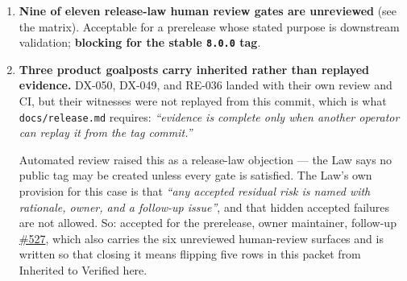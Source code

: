 \begin{enumerate}
\def\labelenumi{\arabic{enumi}.}
\item
  \textbf{Nine of eleven release-law human review gates are unreviewed} (see the matrix). Acceptable for a prerelease whose stated purpose is downstream validation; \textbf{blocking for the stable \texttt{8\allowbreak{}.\allowbreak{}0\allowbreak{}.\allowbreak{}0} tag}.
\item
  \textbf{Three product goalposts carry inherited rather than replayed evidence.} DX-050, DX-049, and RE-036 landed with their own review and CI, but their witnesses were not replayed from this commit, which is what \texttt{d\allowbreak{}o\allowbreak{}c\allowbreak{}s\allowbreak{}/\allowbreak{}r\allowbreak{}e\allowbreak{}l\allowbreak{}e\allowbreak{}a\allowbreak{}s\allowbreak{}e\allowbreak{}.\allowbreak{}m\allowbreak{}d} requires: \emph{``evidence is complete only when another operator can replay it from the tag commit.''}

  Automated review raised this as a release-law objection --- the Law says no public tag may be created unless every gate is satisfied. The Law's own provision for this case is that \emph{``any accepted residual risk is named with rationale, owner, and a follow-up issue''}, and that hidden accepted failures are not allowed. So: accepted for the prerelease, owner maintainer, follow-up \href{https://github.com/flyingrobots/bijou/issues/527}{\#527}, which also carries the six unreviewed human-review surfaces and is written so that closing it means flipping five rows in this packet from Inherited to Verified here.


\end{enumerate}
